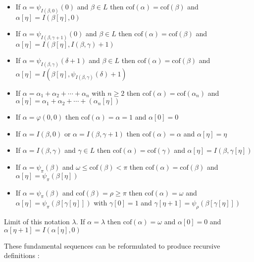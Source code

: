 \documentclass[10pt]{article}
\begin{document}
\begin{itemize}
\bigskip

\item If \(\alpha=\psi_{I(\beta,0)}(0)\) and \(\beta\in L\) then \(\text{cof}(\alpha)=\text{cof}(\beta)\) and \(\alpha[\eta]=I(\beta[\eta],0)\)
\item If \(\alpha=\psi_{I(\beta,\gamma+1)}(0)\) and \(\beta\in L\) then \(\text{cof}(\alpha)=\text{cof}(\beta)\) and \(\alpha[\eta]=I(\beta[\eta],I(\beta,\gamma)+1)\)
\item If \(\alpha=\psi_{I(\beta,\gamma)}(\delta+1)\) and \(\beta\in L\) then \(\text{cof}(\alpha)=\text{cof}(\beta)\) and \(\alpha[\eta]=I(\beta[\eta],\psi_{I(\beta,\gamma)}(\delta)+1)\)

\bigskip

\item If \(\alpha=\alpha_1+\alpha_2+\cdots+\alpha_n\) with \(n\geq 2\) then \(\text{cof}(\alpha)=\text{cof}(\alpha_n)\) and \(\alpha[\eta]=\alpha_1+\alpha_2+\cdots+(\alpha_n[\eta])\)
\item If \(\alpha=\varphi(0,0)\) then \(\text{cof}(\alpha)=\alpha=1\) and \(\alpha[0]=0\)
\item If \(\alpha=I(\beta,0)\) or \(\alpha=I(\beta,\gamma+1)\) then \(\text{cof}(\alpha)=\alpha\) and \(\alpha[\eta]=\eta\)
\item If \(\alpha=I(\beta,\gamma)\) and \(\gamma\in L\) then \(\text{cof}(\alpha)=\text{cof}(\gamma)\) and \(\alpha[\eta]=I(\beta,\gamma[\eta])\)
\item If \(\alpha=\psi_\pi(\beta)\) and \(\omega\le\text{cof}(\beta)<\pi\) then \(\text{cof}(\alpha)=\text{cof}(\beta)\) and \(\alpha[\eta]=\psi_\pi(\beta[\eta])\)
\item If \(\alpha=\psi_\pi(\beta)\) and \(\text{cof}(\beta)=\rho\geq\pi\) then \(\text{cof}(\alpha)=\omega\) and \(\alpha[\eta]=\psi_\pi(\beta[\gamma[\eta]])\) with \(\gamma[0]=1\) and \(\gamma[\eta+1]=\psi_{\rho}(\beta[\gamma[\eta]])\)
\end{itemize}

Limit of this notation \(\lambda\). If \(\alpha=\lambda\) then \(\text{cof}(\alpha)=\omega\) and \(\alpha[0]=0\) and \(\alpha[\eta+1]=I(\alpha[\eta],0)\)

These fundamental sequences can be reformulated to produce recursive definitions :
\end{document}
